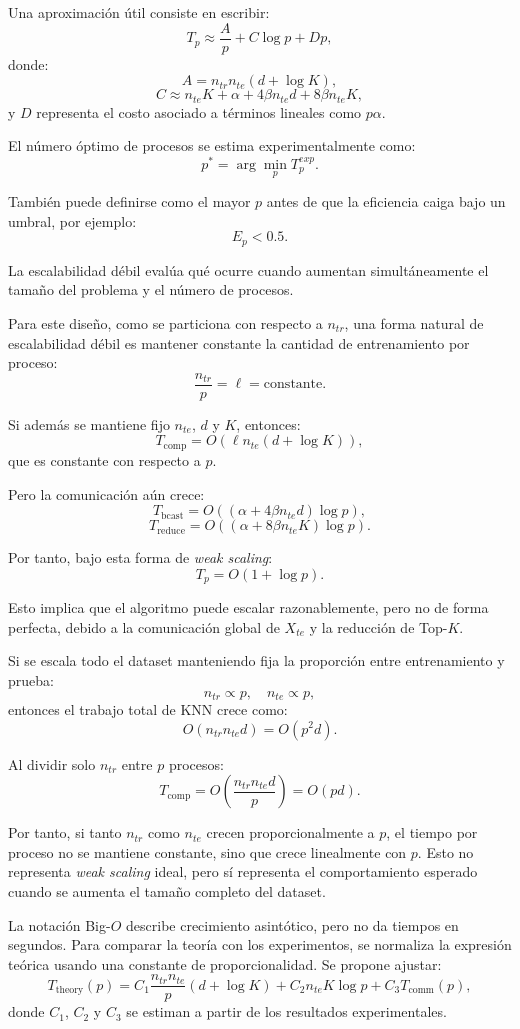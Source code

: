 \documentclass[11pt,a4paper]{article}
\begin{document}
Una aproximación útil consiste en escribir:
\[
T_p \approx \frac{A}{p} + C\log p + Dp,
\]
donde:
\[
A = n_{tr}n_{te}(d+\log K),
\]
\[
C \approx n_{te}K + \alpha + 4\beta n_{te}d + 8\beta n_{te}K,
\]
y $D$ representa el costo asociado a términos lineales como $p\alpha$.

El número óptimo de procesos se estima experimentalmente como:
\[
\boxed{
p^* = \arg\min_p T_p^{exp}
}.
\]

También puede definirse como el mayor $p$ antes de que la eficiencia caiga bajo un umbral,
por ejemplo:
\[
E_p < 0.5.
\]

La escalabilidad débil evalúa qué ocurre cuando aumentan simultáneamente el tamaño del problema
y el número de procesos.

Para este diseño, como se particiona con respecto a $n_{tr}$, una forma natural de escalabilidad
débil es mantener constante la cantidad de entrenamiento por proceso:
\[
\frac{n_{tr}}{p} = \ell = \text{constante}.
\]

Si además se mantiene fijo $n_{te}$, $d$ y $K$, entonces:
\[
T_{\text{comp}}
=
O(\ell n_{te}(d+\log K)),
\]
que es constante con respecto a $p$.

Pero la comunicación aún crece:
\[
T_{\text{bcast}} =
O((\alpha + 4\beta n_{te}d)\log p),
\]
\[
T_{\text{reduce}} =
O((\alpha + 8\beta n_{te}K)\log p).
\]

Por tanto, bajo esta forma de \textit{weak scaling}:
\[
T_p
=
O(1 + \log p).
\]

Esto implica que el algoritmo puede escalar razonablemente, pero no de forma perfecta, debido
a la comunicación global de $X_{te}$ y la reducción de Top-$K$.

Si se escala todo el dataset manteniendo fija la proporción entre entrenamiento y prueba:
\[
n_{tr} \propto p,
\quad
n_{te} \propto p,
\]
entonces el trabajo total de KNN crece como:
\[
O(n_{tr}n_{te}d) = O(p^2d).
\]

Al dividir solo $n_{tr}$ entre $p$ procesos:
\[
T_{\text{comp}}
=
O\left(
\frac{n_{tr}n_{te}d}{p}
\right)
=
O(pd).
\]

Por tanto, si tanto $n_{tr}$ como $n_{te}$ crecen proporcionalmente a $p$, el tiempo por proceso
no se mantiene constante, sino que crece linealmente con $p$. Esto no representa \textit{weak scaling}
ideal, pero sí representa el comportamiento esperado cuando se aumenta el tamaño completo del
dataset.

La notación Big-$O$ describe crecimiento asintótico, pero no da tiempos en segundos. Para comparar
la teoría con los experimentos, se normaliza la expresión teórica usando una constante de
proporcionalidad. Se propone ajustar:
\[
T_{\text{theory}}(p)
=
C_1
\frac{n_{tr}n_{te}}{p}(d+\log K)
+
C_2 n_{te}K\log p
+
C_3 T_{\text{comm}}(p),
\]
donde $C_1$, $C_2$ y $C_3$ se estiman a partir de los resultados experimentales.
\end{document}
